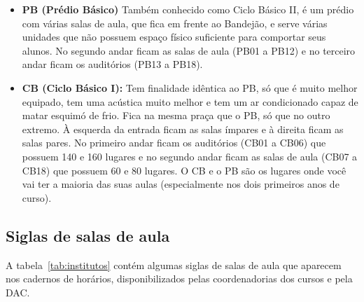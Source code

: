 \begin{itemize}
\item  \textbf{PB (Prédio Básico)} Também conhecido como Ciclo Básico II, é um prédio com várias salas de aula, que fica em frente ao Bandejão, e serve várias unidades que não possuem espaço físico suficiente para comportar seus alunos. No segundo andar ficam as salas de aula (PB01 a PB12) e no terceiro andar ficam os auditórios (PB13 a PB18).
\end{itemize}

\begin{itemize}
\item  \textbf{CB (Ciclo Básico I):} Tem finalidade idêntica ao PB, só que é muito melhor equipado, tem uma acústica muito melhor e tem um ar condicionado capaz de matar esquimó de frio. Fica na mesma praça que o PB, só que no outro extremo. À esquerda da entrada ficam as salas ímpares e à direita ficam as salas pares. No primeiro andar ficam os auditórios (CB01 a CB06) que possuem 140 e 160 lugares e no segundo andar ficam as salas de aula (CB07 a CB18) que possuem 60 e 80 lugares.  O CB e o PB são os lugares onde você vai ter a maioria das suas aulas (especialmente nos dois primeiros anos de curso).
\end{itemize}

\subsection{Siglas de salas de aula}

A tabela~\ref{tab:institutos} contém algumas siglas de salas de aula que aparecem nos cadernos
de horários, disponibilizados pelas coordenadorias dos cursos e pela DAC.

